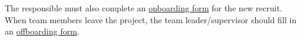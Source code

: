 The responsible must also complete an \href{https://project.lsst.org/onboarding/form}{onboarding form} for the new recruit.
When team members leave the project, the team leader/supervisor should fill in an \href{https://project.lsst.org/onboarding/offboarding_form}{offboarding form}.

